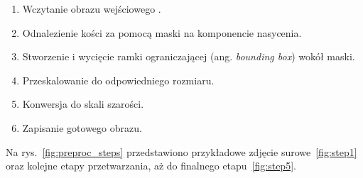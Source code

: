 \begin{enumerate}
    \item Wczytanie obrazu wejściowego .
    \item Odnalezienie kości za pomocą maski na komponencie nasycenia.
    \item Stworzenie i wycięcie ramki ograniczającej (ang. \textit{bounding box}) wokół maski.
    \item Przeskalowanie do odpowiedniego rozmiaru.
    \item Konwersja do skali szarości.
    \item Zapisanie gotowego obrazu.
\end{enumerate}

Na rys.~\ref{fig:preproc_steps} przedstawiono przykładowe zdjęcie surowe~\ref{fig:step1}
oraz kolejne etapy przetwarzania, aż do finalnego etapu~\ref{fig:step5}.

